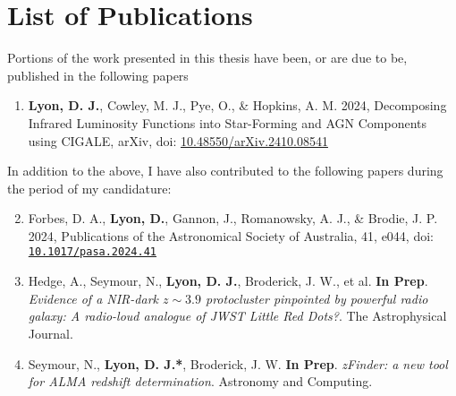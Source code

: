 \chapter{List of Publications}
\thispagestyle{empty}

Portions of the work presented in this thesis have been, or are due to be, published in the following papers

\vspace{0.5cm}
\begin{enumerate}
    \item \textbf{Lyon, D. J.}, Cowley, M. J., Pye, O., \& Hopkins, A. M. 2024, Decomposing Infrared Luminosity Functions into Star-Forming and AGN Components using CIGALE, arXiv, doi: \href{http://doi.org/10.48550/arXiv.2410.08541}{10.48550/arXiv.2410.08541}
\end{enumerate}

\vspace{0.5cm}
\noindent
In addition to the above, I have also contributed to the following papers during the
period of my candidature:

\vspace{0.5cm}
\begin{enumerate}
    \setcounter{enumi}{1}
    
    \item Forbes, D. A., \textbf{Lyon, D.}, Gannon, J., Romanowsky, A. J., \& Brodie, J. P. 2024, Publications of the Astronomical Society of Australia, 41, e044, doi: \href{https://doi.org/10.1017/pasa.2024.41}{\nolinkurl{10.1017/pasa.2024.41}}
    
    \item Hedge, A., Seymour, N., \textbf{Lyon, D. J.}, Broderick, J. W., et al. \textbf{In Prep}. \textit{Evidence of a NIR-dark $z\sim3.9$ protocluster pinpointed by powerful radio galaxy: A radio-loud analogue of {\it JWST} Little Red Dots?}. The Astrophysical Journal.

    \item Seymour, N., \textbf{Lyon, D. J.*}, Broderick, J. W. \textbf{In Prep}. \textit{zFinder: a new tool for ALMA redshift determination}. Astronomy and Computing.
\end{enumerate}